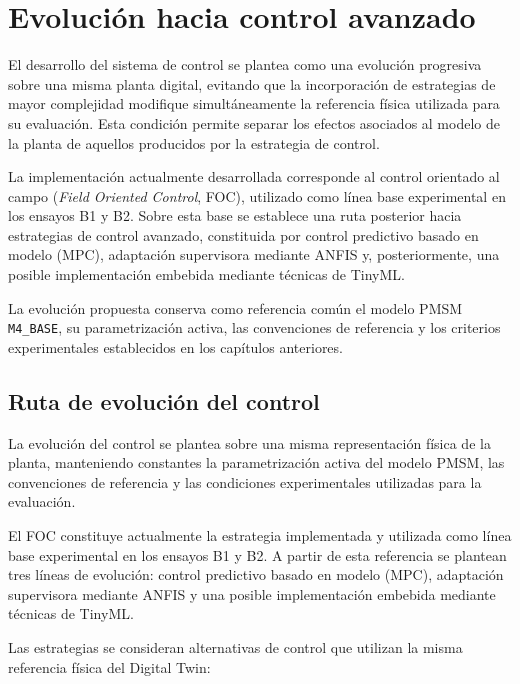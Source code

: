 \section{Evolución hacia control avanzado}

El desarrollo del sistema de control se plantea como una evolución progresiva sobre una misma planta digital, evitando que la incorporación de estrategias de mayor complejidad modifique simultáneamente la referencia física utilizada para su evaluación. Esta condición permite separar los efectos asociados al modelo de la planta de aquellos producidos por la estrategia de control.

La implementación actualmente desarrollada corresponde al control orientado al campo (\textit{Field Oriented Control}, FOC), utilizado como línea base experimental en los ensayos B1 y B2. Sobre esta base se establece una ruta posterior hacia estrategias de control avanzado, constituida por control predictivo basado en modelo (MPC), adaptación supervisora mediante ANFIS y, posteriormente, una posible implementación embebida mediante técnicas de TinyML.

La evolución propuesta conserva como referencia común el modelo PMSM \texttt{M4\_BASE}, su parametrización activa, las convenciones de referencia y los criterios experimentales establecidos en los capítulos anteriores.

\subsection{Ruta de evolución del control}

La evolución del control se plantea sobre una misma representación física de la planta, manteniendo constantes la parametrización activa del modelo PMSM, las convenciones de referencia y las condiciones experimentales utilizadas para la evaluación.

El FOC constituye actualmente la estrategia implementada y utilizada como línea base experimental en los ensayos B1 y B2. A partir de esta referencia se plantean tres líneas de evolución: control predictivo basado en modelo (MPC), adaptación supervisora mediante ANFIS y una posible implementación embebida mediante técnicas de TinyML.

Las estrategias se consideran alternativas de control que utilizan la misma referencia física del Digital Twin:

